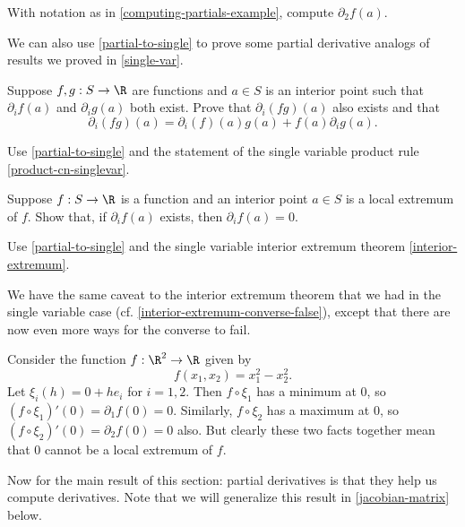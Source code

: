 \begin{exercise}
	With notation as in \cref{computing-partials-example}, compute $\partial_2 f(a)$. 
\end{exercise}

We can also use \cref{partial-to-single} to prove some partial derivative analogs of results we proved in \cref{single-var}.

\begin{exercise} \label{product-rule-partials}
	Suppose $f, g : S \to \R$ are functions and $a \in S$ is an interior point such that $\partial_i f(a)$ and $\partial_i g(a)$ both exist. Prove that $\partial_i (fg)(a)$ also exists and that
	\[ \partial_i (fg)(a) = \partial_i(f)(a) g(a) + f(a) \partial_i g(a). \]
	\begin{hint} Use \cref{partial-to-single} and the statement of the single variable product rule \ref{product-cn-singlevar}. \end{hint}
\end{exercise}

\begin{exercise} \label{interior-extremum-multivar}
	Suppose $f : S \to \R$ is a function and an interior point $a \in S$ is a local extremum of $f$. Show that, if $\partial_i f(a)$ exists, then $\partial_i f(a) = 0$. \begin{hint} Use \cref{partial-to-single} and the single variable interior extremum theorem \ref{interior-extremum}. \end{hint}
\end{exercise}

We have the same caveat to the interior extremum theorem that we had in the single variable case (cf. \cref{interior-extremum-converse-false}), except that there are now even more ways for the converse to fail. 

\begin{example}
	Consider the function $f : \R^2 \to \R$ given by \[ f(x_1, x_2) = x_1^2 - x_2^2. \]
	Let $\xi_i(h) = 0 + h e_i$ for $i = 1, 2$. Then $f \circ \xi_1$ has a minimum at 0, so $(f \circ \xi_1)'(0) = \partial_1 f(0) = 0$. Similarly, $f \circ \xi_2$ has a maximum at 0, so $(f \circ \xi_2)'(0) = \partial_2 f(0) = 0$ also. But clearly these two facts together mean that 0 cannot be a local extremum of $f$. 
	
\end{example}

Now for the main result of this section: partial derivatives is that they help us compute derivatives. Note that we will generalize this result in \cref{jacobian-matrix} below. 

